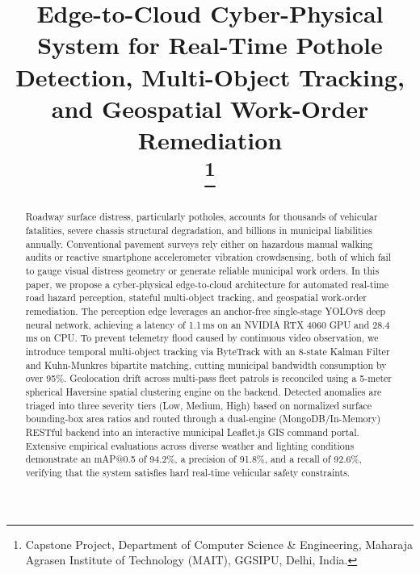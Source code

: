 \documentclass[conference]{IEEEtran}
\begin{document}
\title{Edge-to-Cloud Cyber-Physical System for Real-Time Pothole Detection, Multi-Object Tracking, and Geospatial Work-Order Remediation\\
\thanks{Capstone Project, Department of Computer Science \& Engineering, Maharaja Agrasen Institute of Technology (MAIT), GGSIPU, Delhi, India.}
}

\author{
}

\maketitle

\begin{abstract}
Roadway surface distress, particularly potholes, accounts for thousands of vehicular fatalities, severe chassis structural degradation, and billions in municipal liabilities annually. Conventional pavement surveys rely either on hazardous manual walking audits or reactive smartphone accelerometer vibration crowdsensing, both of which fail to gauge visual distress geometry or generate reliable municipal work orders. In this paper, we propose a cyber-physical edge-to-cloud architecture for automated real-time road hazard perception, stateful multi-object tracking, and geospatial work-order remediation. The perception edge leverages an anchor-free single-stage YOLOv8 deep neural network, achieving a latency of 1.1\,ms on an NVIDIA RTX 4060 GPU and 28.4\,ms on CPU. To prevent telemetry flood caused by continuous video observation, we introduce temporal multi-object tracking via ByteTrack with an 8-state Kalman Filter and Kuhn-Munkres bipartite matching, cutting municipal bandwidth consumption by over 95\%. Geolocation drift across multi-pass fleet patrols is reconciled using a 5-meter spherical Haversine spatial clustering engine on the backend. Detected anomalies are triaged into three severity tiers (Low, Medium, High) based on normalized surface bounding-box area ratios and routed through a dual-engine (MongoDB/In-Memory) RESTful backend into an interactive municipal Leaflet.js GIS command portal. Extensive empirical evaluations across diverse weather and lighting conditions demonstrate an mAP@0.5 of 94.2\%, a precision of 91.8\%, and a recall of 92.6\%, verifying that the system satisfies hard real-time vehicular safety constraints.
\end{abstract}
\end{document}
